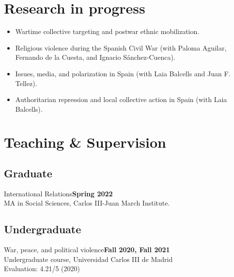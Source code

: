 \documentclass[a4paper, 12pt]{article}
\begin{document}
\section*{Research in progress}

\begin{itemize}[leftmargin=*, nolistsep]
\item Wartime collective targeting and postwar ethnic mobilization.
\item Religious violence during the Spanish Civil War (with Paloma Aguilar, Fernando de la Cuesta, and Ignacio Sánchez-Cuenca).
\item Issues, media, and polarization in Spain (with Laia Balcells and Juan F. Tellez).
\item Authoritarian repression and local collective action in Spain (with Laia Balcells).
\end{itemize}

\section*{Teaching \& Supervision}


\subsection*{Graduate}

\noindent
International Relations\hfill\textbf{Spring 2022}\\
{\small MA in Social Sciences, Carlos III-Juan March Institute.}

\vspace{-10pt}
\subsection*{Undergraduate}

\noindent
War, peace, and political violence\hfill\textbf{Fall 2020, Fall 2021}\\
{\small Undergraduate course, Universidad Carlos III de Madrid}\\
{\small Evaluation: 4.21/5 (2020)}
\vspace{10pt}
\end{document}
